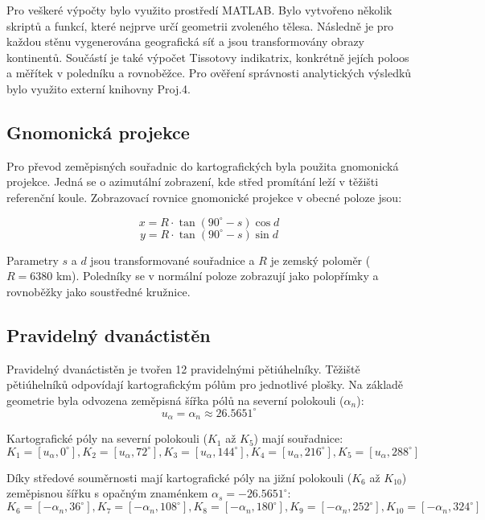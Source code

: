 \documentclass[12pt, a4paper]{article}
\begin{document}
\noindent Pro veškeré výpočty bylo využito prostředí MATLAB. Bylo vytvořeno několik skriptů a funkcí, které nejprve určí geometrii zvoleného tělesa. Následně je pro každou stěnu vygenerována geografická síť a jsou transformovány obrazy kontinentů. Součástí je také výpočet Tissotovy indikatrix, konkrétně jejích poloos a měřítek v poledníku a rovnoběžce. Pro ověření správnosti analytických výsledků bylo využito externí knihovny Proj.4.

\subsection*{Gnomonická projekce}
\noindent Pro převod zeměpisných souřadnic do kartografických byla použita gnomonická projekce. Jedná se o azimutální zobrazení, kde střed promítání leží v těžišti referenční koule. Zobrazovací rovnice gnomonické projekce v obecné poloze jsou:
\vspace{3mm}

$$x = R \cdot \tan(90^{\circ} - s) \cos d$$
\vspace{3mm}
$$y = R \cdot \tan(90^{\circ} - s) \sin d$$
\vspace{3mm}

\noindent Parametry $s$ a $d$ jsou transformované souřadnice a $R$ je zemský poloměr ($R = 6380$ km). Poledníky se v normální poloze zobrazují jako polopřímky a rovnoběžky jako soustředné kružnice.

\newpage
\subsection*{Pravidelný dvanáctistěn}
Pravidelný dvanáctistěn je tvořen 12 pravidelnými pětiúhelníky. Těžiště pětiúhelníků odpovídají kartografickým pólům pro jednotlivé plošky. Na základě geometrie byla odvozena zeměpisná šířka pólů na severní polokouli ($\alpha_n$):
$$u_{\alpha} = \alpha_n \approx 26.5651^{\circ}$$

\noindent Kartografické póly na severní polokouli ($K_1$ až $K_5$) mají souřadnice:
$$K_1=[u_{\alpha}, 0^{\circ}], K_2=[u_{\alpha}, 72^{\circ}], K_3=[u_{\alpha}, 144^{\circ}], K_4=[u_{\alpha}, 216^{\circ}], K_5=[u_{\alpha}, 288^{\circ}]$$

\noindent Díky středové souměrnosti mají kartografické póly na jižní polokouli ($K_6$ až $K_{10}$) zeměpisnou šířku s opačným znaménkem $\alpha_s = -26.5651^{\circ}$:
$$K_6=[-\alpha_n, 36^{\circ}], K_7=[-\alpha_n, 108^{\circ}], K_8=[-\alpha_n, 180^{\circ}], K_9=[-\alpha_n, 252^{\circ}], K_{10}=[-\alpha_n, 324^{\circ}]$$
\end{document}
